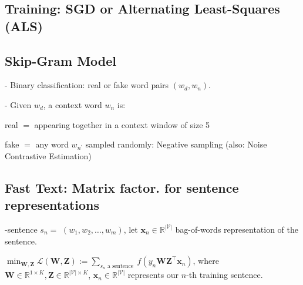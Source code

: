 
\subsection*{Training: SGD or Alternating Least-Squares (ALS)}


\subsection*{Skip-Gram Model}
- Binary classification: real or fake word pairs $\left(w_{d}, w_{n}\right)$.

- Given $w_{d}$, a context word $w_{n}$ is:

real $=$ appearing together in a context window of size 5

fake $=$ any word $w_{n^{\prime}}$ sampled randomly: Negative sampling (also: Noise Contrastive Estimation)





\subsection*{Fast Text: Matrix factor. for sentence representations}

-sentence $s_{n}=$ $\left(w_{1}, w_{2}, \ldots, w_{m}\right)$, let $\mathbf{x}_{n} \in \mathbb{R}^{|\mathcal{V}|}$ bag-of-words representation of the sentence.

$
\min _{\mathbf{W}, \mathbf{Z}} \mathcal{L}(\mathbf{W}, \mathbf{Z}):=\sum_{s_{n} \text { a sentence }} f\left(y_{n} \mathbf{W} \mathbf{Z}^{\top} \mathbf{x}_{n}\right)
$,
where $\mathbf{W} \in \mathbb{R}^{1 \times K}, \mathbf{Z} \in \mathbb{R}^{|\mathcal{V}| \times K}$, $\mathbf{x}_{n} \in \mathbb{R}^{|\mathcal{V}|}$ represents our $n$-th training sentence.

